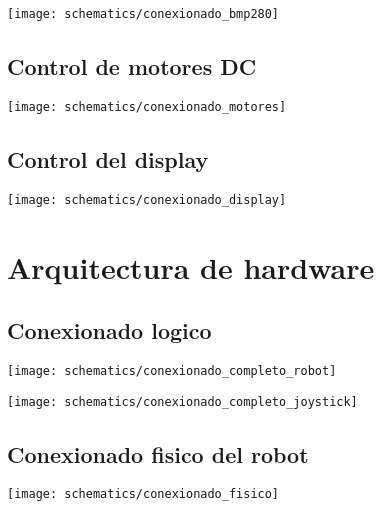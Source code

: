 \begin{center}
  \texttt{[image: schematics/conexionado\_bmp280]}
    \label{fig:conexionado_bmp280}
\end{center}




\subsection{Control de motores DC}


\begin{center}
  \texttt{[image: schematics/conexionado\_motores]}
    \label{fig:conexionado_motores}

\end{center}






\subsection{Control del display}
 
\begin{center}
  \texttt{[image: schematics/conexionado\_display]}
    \label{fig:conexionado_display}

\end{center}




\section{Arquitectura de hardware}


\subsection{Conexionado logico }


\begin{center}
  \texttt{[image: schematics/conexionado\_completo\_robot]}
    \label{fig:conexionado_completo_robot}
\end{center}



\begin{center}
  \texttt{[image: schematics/conexionado\_completo\_joystick]}
    \label{fig:conexionado_completo_joystick}
\end{center}





\subsection{Conexionado fisico del robot}

\begin{center}
  \texttt{[image: schematics/conexionado\_fisico]}
    \label{fig:conexionado_fisico}
\end{center}



